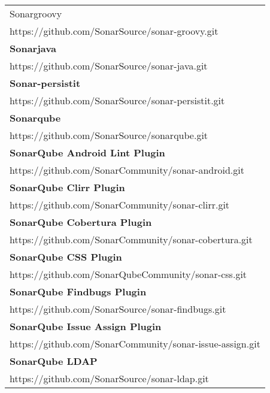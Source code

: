 \begin{table}[]
\begin{tabular}{|p{130mm}|}
Sonargroovy                                        \\ https://github.com/SonarSource/sonar-groovy.git                              \\ \hline \bf
Sonarjava                                          \\ https://github.com/SonarSource/sonar-java.git                                \\ \hline \bf
Sonar-persistit                                    \\ https://github.com/SonarSource/sonar-persistit.git                           \\ \hline \bf
Sonarqube                                          \\ https://github.com/SonarSource/sonarqube.git                                 \\ \hline \bf
SonarQube Android Lint Plugin                      \\ https://github.com/SonarCommunity/sonar-android.git                          \\ \hline \bf 
SonarQube Clirr Plugin                             \\ https://github.com/SonarCommunity/sonar-clirr.git                            \\ \hline \bf
SonarQube Cobertura Plugin                         \\ https://github.com/SonarCommunity/sonar-cobertura.git                        \\ \hline \bf
SonarQube CSS Plugin                               \\ https://github.com/SonarQubeCommunity/sonar-css.git                          \\ \hline \bf
SonarQube Findbugs Plugin                          \\ https://github.com/SonarSource/sonar-findbugs.git                            \\ \hline \bf
SonarQube Issue Assign Plugin                      \\ https://github.com/SonarCommunity/sonar-issue-assign.git                     \\ \hline \bf
SonarQube LDAP                                     \\ https://github.com/SonarSource/sonar-ldap.git                                \\ \hline 

\end{tabular}
\end{table}

